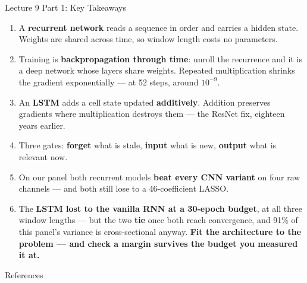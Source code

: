 \documentclass[aspectratio=169, 11pt]{beamer}
\begin{document}
\begin{frame}{Lecture 9 Part 1: Key Takeaways}
  \begin{keybox}
    {\footnotesize
    \begin{enumerate}\itemsep2pt
      \item A \textbf{recurrent network} reads a sequence in order and carries a hidden state.
            Weights are shared across time, so window length costs no parameters.

      \item Training is \textbf{backpropagation through time}: unroll the recurrence and it is a
            deep network whose layers share weights. Repeated multiplication shrinks the
            gradient exponentially --- at 52 steps, around $10^{-9}$.

      \item An \textbf{LSTM} adds a cell state updated \textbf{additively}. Addition preserves
            gradients where multiplication destroys them --- the ResNet fix, eighteen years
            earlier.

      \item Three gates: \textbf{forget} what is stale, \textbf{input} what is new,
            \textbf{output} what is relevant now.

      \item On our panel both recurrent models \textbf{beat every CNN variant} on four raw
            channels --- and both still lose to a 46-coefficient LASSO.

      \item The \textbf{LSTM lost to the vanilla RNN at a 30-epoch budget}, at all three window
            lengths --- but the two \textbf{tie} once both reach convergence, and 91\% of this
            panel's variance is cross-sectional anyway. \textbf{Fit the architecture to the
            problem --- and check a margin survives the budget you measured it at.}
    \end{enumerate}
    }
  \end{keybox}
\end{frame}

\begin{frame}[allowframebreaks]{References}
  \printbibliography[heading=none]
\end{frame}
\end{document}
